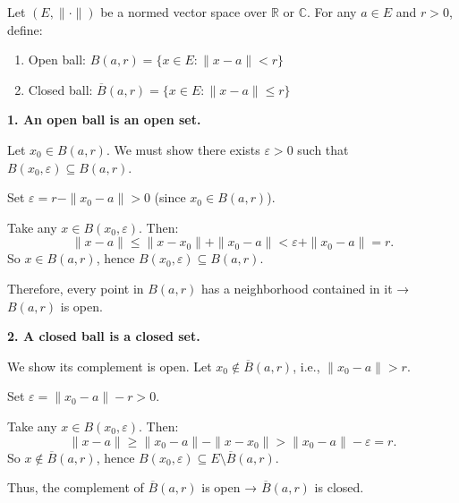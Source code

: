 \documentclass[12pt]{article}
\begin{document}
\begin{correctionbox}
Let $(E, \|\cdot\|)$ be a normed vector space over $\mathbb{R}$ or $\mathbb{C}$. For any $a \in E$ and $r > 0$, define:

\begin{enumerate}
    \item Open ball: $ B(a,r) = \{ x \in E : \|x - a\| < r \} $
    \item Closed ball: $ \overline{B}(a,r) = \{ x \in E : \|x - a\| \leq r \} $
\end{enumerate}

\medskip

\textbf{1. An open ball is an open set.}

Let $ x_0 \in B(a,r) $. We must show there exists $ \varepsilon > 0 $ such that $ B(x_0, \varepsilon) \subseteq B(a,r) $.

Set $ \varepsilon = r - \|x_0 - a\| > 0 $ (since $ x_0 \in B(a,r) $).

Take any $ x \in B(x_0, \varepsilon) $. Then:
\[
\|x - a\| \leq \|x - x_0\| + \|x_0 - a\| < \varepsilon + \|x_0 - a\| = r.
\]
So $ x \in B(a,r) $, hence $ B(x_0, \varepsilon) \subseteq B(a,r) $.

Therefore, every point in $ B(a,r) $ has a neighborhood contained in it → $ B(a,r) $ is open.

\medskip

\textbf{2. A closed ball is a closed set.}

We show its complement is open. Let $ x_0 \notin \overline{B}(a,r) $, i.e., $ \|x_0 - a\| > r $.

Set $ \varepsilon = \|x_0 - a\| - r > 0 $.

Take any $ x \in B(x_0, \varepsilon) $. Then:
\[
\|x - a\| \geq \|x_0 - a\| - \|x - x_0\| > \|x_0 - a\| - \varepsilon = r.
\]
So $ x \notin \overline{B}(a,r) $, hence $ B(x_0, \varepsilon) \subseteq E \setminus \overline{B}(a,r) $.

Thus, the complement of $ \overline{B}(a,r) $ is open → $ \overline{B}(a,r) $ is closed.
\end{correctionbox}

\end{document}
